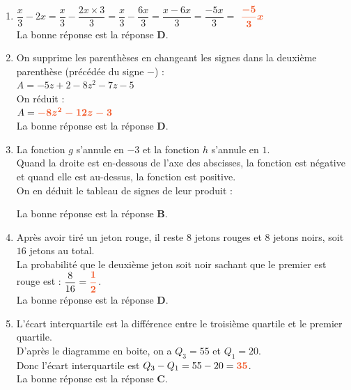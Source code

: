 \documentclass[a4paper,11pt]{article}
\newcounter{seancenum}
\begin{document}
\setcounter{seancenum}{30}
\newpage
\begin{seance}{} %

\begin{enumerate}
\item $\dfrac{x}{3}-2x=\dfrac{x}{3}-\dfrac{2x\times 3}{3}=\dfrac{x}{3}-\dfrac{6x}{3}=\dfrac{x-6x}{3}=\dfrac{-5x}{3}=$ ${\color[HTML]{F15929}\boldsymbol{\dfrac{-5}{3}x}}$\\La bonne réponse est la réponse {\bfseries \color[HTML]{F15929}D}.

\item On supprime les parenthèses en changeant les signes dans la deuxième parenthèse (précédée du signe $-$) :\\$A= -5z+2 -8z^2-7z-5$\\On réduit :\\$A={\color[HTML]{F15929}\boldsymbol{-8z^2-12z-3}}$\\La bonne réponse est la réponse {\bfseries \color[HTML]{F15929}D}.

\item La fonction $g$ s'annule en $-3$ et la fonction $h$ s'annule en $1$.\\
    Quand la droite est en-dessous de l'axe des abscisses, la fonction est négative et quand elle est au-dessus, la fonction est positive.\\
    On en déduit le tableau de signes de leur produit :\\
    \begin{center}
    \end{center}
La bonne réponse est la réponse {\bfseries \color[HTML]{F15929}B}.

\item Après avoir tiré un jeton rouge, il reste $8$ jetons rouges et $8$ jetons noirs, soit $16$ jetons au total.\\La probabilité que le deuxième jeton soit noir sachant que le premier est rouge est : $\dfrac{8}{16}={\color[HTML]{F15929}\boldsymbol{\dfrac{1}{2}}}$.\\La bonne réponse est la réponse {\bfseries \color[HTML]{F15929}D}.

\item L'écart interquartile est la différence entre le troisième quartile et le premier quartile.\\
      D'après le diagramme en boite, on a $Q_3 = 55$ et $Q_1 = 20$.\\
      Donc l'écart interquartile est $Q_3 - Q_1 = 55 - 20 = {\color[HTML]{F15929}\boldsymbol{35}}$.\\La bonne réponse est la réponse {\bfseries \color[HTML]{F15929}C}.


\end{enumerate}
\end{seance}
\end{document}

